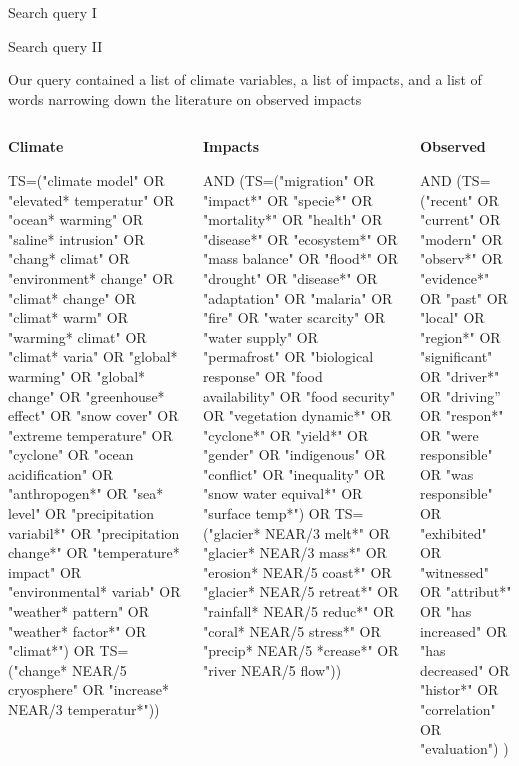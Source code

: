 \documentclass[9pt]{beamer}
\begin{document}
\begin{frame}{Search query I}
\begin{figure}
\end{figure}
\end{frame}

\begin{frame}{Search query II}

Our query contained a list of climate variables, a list of impacts, and a list of words narrowing down the literature on observed impacts

\begin{columns}
\begin{column}{0.33\linewidth}
	\textbf{Climate}
	
	\scriptsize
	
	TS=("climate model" OR "elevated* temperatur" OR "ocean* warming" OR "saline* intrusion" OR "chang* climat" OR "environment* change" OR "climat* change" OR "climat* warm" OR "warming* climat" OR "climat* varia" OR "global* warming" OR "global* change" OR "greenhouse* effect" OR "snow cover" OR "extreme temperature" OR "cyclone" OR "ocean acidification" OR "anthropogen*" OR "sea* level" OR "precipitation variabil*" OR "precipitation change*" OR "temperature* impact" OR "environmental* variab" OR "weather* pattern" OR "weather* factor*" OR "climat*") OR TS=("change* NEAR/5 cryosphere" OR "increase* NEAR/3 temperatur*")) 
	
\end{column}
\begin{column}{0.33\linewidth}
	
	\textbf{Impacts}
	
	\scriptsize
	
	AND (TS=("migration" OR "impact*" OR "specie*" OR "mortality*" OR "health" OR "disease*" OR "ecosystem*" OR "mass balance" OR "flood*" OR "drought" OR "disease*" OR "adaptation" OR "malaria" OR "fire" OR "water scarcity" OR "water supply" OR "permafrost" OR "biological response" OR "food availability" OR "food security" OR "vegetation dynamic*" OR "cyclone*" OR "yield*" OR "gender" OR "indigenous" OR "conflict" OR "inequality" OR "snow water equival*" OR "surface temp*") OR TS=("glacier* NEAR/3 melt*" OR "glacier* NEAR/3 mass*" OR "erosion* NEAR/5 coast*" OR "glacier* NEAR/5 retreat*" OR "rainfall* NEAR/5 reduc*" OR "coral* NEAR/5 stress*" OR "precip* NEAR/5 *crease*" OR "river NEAR/5 flow"))
	
\end{column}
\begin{column}{0.33\linewidth}
	
	\textbf{Observed}
	
	\scriptsize
	
	AND (TS=("recent" OR "current" OR "modern" OR "observ*" OR "evidence*" OR "past" OR "local" OR "region*" OR "significant" OR "driver*" OR "driving” OR "respon*" OR "were responsible" OR "was responsible" OR "exhibited" OR "witnessed" OR "attribut*" OR "has increased" OR "has decreased" OR "histor*" OR "correlation" OR "evaluation") )
\end{column}	
\end{columns}

\end{frame}
\end{document}
